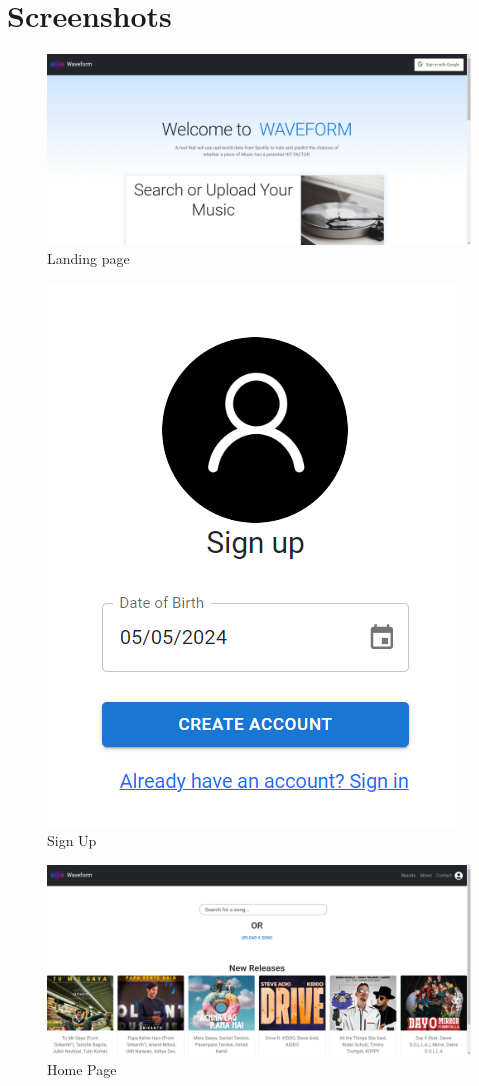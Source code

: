 \documentclass[11pt]{report}
\begin{document}
\newpage

\section{Screenshots}
\begin{figure}[h]
    \centering
    \includegraphics[width=.95\linewidth]{screenshots/1.landing.png}
    \caption{Landing page}
  
\end{figure}

\begin{figure}[h]
    \centering
    \includegraphics[width=.33\linewidth]{screenshots/2.signup.png}
    \caption{Sign Up}
    
\end{figure}
\clearpage
\begin{figure}[h]
    \centering
    \includegraphics[width=.95\linewidth]{screenshots/3.homepage.png}
    \caption{Home Page}
    
\end{figure}
\end{document}
